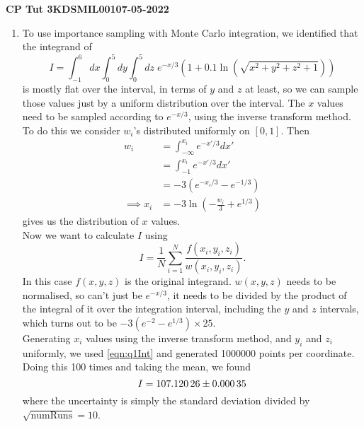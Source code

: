 \documentclass[11pt]{article}
\begin{document}
\begin{center}
    \textbf{CP Tut 3}\hspace{2in}\textbf{KDSMIL001}\hspace{2in}\textbf{07-05-2022}
\end{center}

\begin{enumerate}
    \item To use importance sampling with Monte Carlo integration, we identified that the integrand of 
    \begin{equation}
        I=\int_{-1}^6 dx \int_0^5 dy \int_0^5 dz \; e^{-x/3} \left(1+0.1\ln(\sqrt{x^2+y^2+z^2+1})\right)
    \end{equation}
    is mostly flat over the interval, in terms of $y$ and $z$ at least, so we can sample those values just by a uniform distribution over the interval. The $x$ values need to be sampled according to $e^{-x/3}$, using the inverse transform method. To do this we consider $w_i$'s distributed uniformly on $[0,1]$. Then
    \begin{align*}
        w_i&=\int_{-\infty}^{x_i}e^{-x'/3}dx'\\
        &=\int_{-1}^{x_i}e^{-x'/3}dx'\\
        &=-3(e^{-x_i/3}-e^{-1/3})\\
        \implies x_i&=-3\ln\left(-\frac{w_i}{3}+e^{1/3}\right)
    \end{align*}
    gives us the distribution of $x$ values.\\
    Now we want to calculate $I$ using 
    \begin{equation}
        I=\frac{1}{N}\sum_{i=1}^N \frac{f(x_i, y_i, z_i)}{w(x_i, y_i, z_i)}.
        \label{eqn:q1Int}
    \end{equation}
    In this case $f(x,y,z)$ is the original integrand. $w(x,y,z)$ needs to be normalised, so can't just be $e^{-x/3}$, it needs to be divided by the product of the integral of it over the integration interval, including the $y$ and $z$ intervals, which turns out to be $-3(e^{-2}-e^{1/3})\times 25$.\\
    Generating $x_i$ values using the inverse transform method, and $y_i$ and $z_i$ uniformly, we used \cref{eqn:q1Int} and generated \num[]{1000000} points per coordinate. Doing this 100 times and taking the mean, we found
    \begin{equation}
        I=\num[]{107.12026 \pm 0.00035}
    \end{equation}
    where the uncertainty is simply the standard deviation divided by $\sqrt{\mathrm{numRuns}}=10$.


\end{enumerate}
\end{document}
